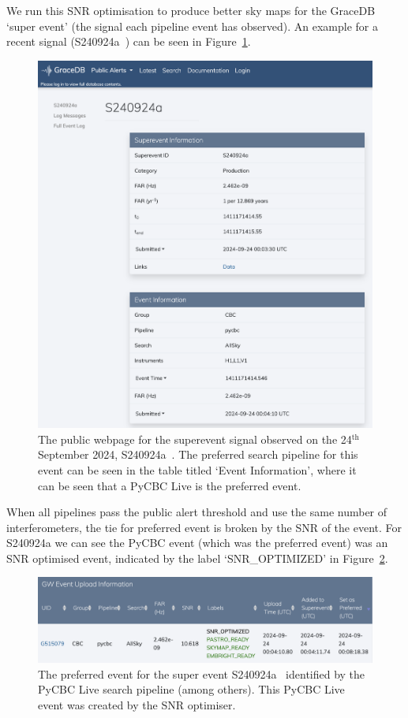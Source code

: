 We run this SNR optimisation to produce better sky maps for the GraceDB `super event' (the \gwadj signal each pipeline event has observed). An example for a recent \gwadj signal (S240924a~\cite{superevent_S240924a}) can be seen in Figure~\ref{7:fig:gracedb_pref_event}.
%
\begin{figure}
    \centering
    \includegraphics[width=1.0\linewidth]{images/7_snr_optimiser/gracedb_public_snr_optimiser.png}
    \caption{The public webpage for the superevent \gwadj signal observed on the 24$^{\text{th}}$ September 2024, S240924a~\cite{superevent_S240924a}. The preferred search pipeline for this event can be seen in the table titled `Event Information', where it can be seen that a PyCBC Live is the preferred event.}
    \label{7:fig:gracedb_pref_event}
\end{figure}
%
When all pipelines pass the public alert threshold and use the same number of interferometers, the tie for preferred event is broken by the SNR of the event. For S240924a we can see the PyCBC event (which was the preferred event) was an SNR optimised event, indicated by the label `SNR\_OPTIMIZED' in Figure~\ref{7:fig:gracedb_snr_optimizer}.
%
\begin{figure}
    \centering
    \includegraphics[width=1.0\linewidth]{images/7_snr_optimiser/gracedb_pycbc_pref_event.png}
    \caption{The preferred event for the super event S240924a~\cite{superevent_S240924a} identified by the PyCBC Live search pipeline (among others). This PyCBC Live event was created by the SNR optimiser.}
    \label{7:fig:gracedb_snr_optimizer}
\end{figure}
%

